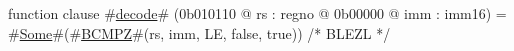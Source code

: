 function clause #\hyperref[zdecode]{decode}# (0b010110 @ rs : regno @ 0b00000 @ imm : imm16) =
  #\hyperref[zSome]{Some}#(#\hyperref[zBCMPZ]{BCMPZ}#(rs, imm, LE, false, true))  /* BLEZL */
